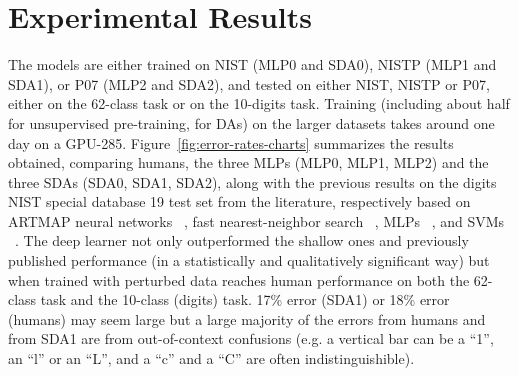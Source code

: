 \documentclass{article} %
\begin{document}
\section{Experimental Results}
\vspace*{-2mm}

The models are either trained on NIST (MLP0 and SDA0), 
NISTP (MLP1 and SDA1), or P07 (MLP2 and SDA2), and tested
on either NIST, NISTP or P07, either on the 62-class task
or on the 10-digits task. Training (including about half
for unsupervised pre-training, for DAs) on the larger
datasets takes around one day on a GPU-285.
Figure~\ref{fig:error-rates-charts} summarizes the results obtained,
comparing humans, the three MLPs (MLP0, MLP1, MLP2) and the three SDAs (SDA0, SDA1,
SDA2), along with the previous results on the digits NIST special database
19 test set from the literature, respectively based on ARTMAP neural
networks ~\citep{Granger+al-2007}, fast nearest-neighbor search
~\citep{Cortes+al-2000}, MLPs ~\citep{Oliveira+al-2002-short}, and SVMs
~\citep{Milgram+al-2005}.%
The deep learner not only outperformed the shallow ones and
previously published performance (in a statistically and qualitatively
significant way) but when trained with perturbed data
reaches human performance on both the 62-class task
and the 10-class (digits) task. 
17\% error (SDA1) or 18\% error (humans) may seem large but a large
majority of the errors from humans and from SDA1 are from out-of-context
confusions (e.g. a vertical bar can be a ``1'', an ``l'' or an ``L'', and a
``c'' and a ``C'' are often indistinguishible).
\end{document}
